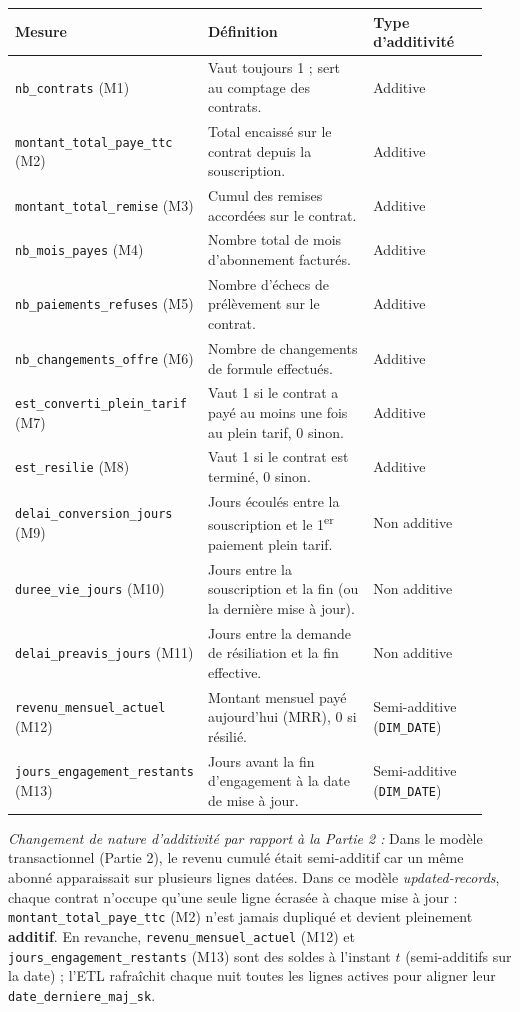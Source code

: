 \documentclass[a4paper,12pt]{article}
\begin{document}
\begin{center}
\renewcommand{\arraystretch}{1.25}
\begin{tabular}{@{}p{0.28\linewidth}p{0.40\linewidth}p{0.26\linewidth}@{}}
  \toprule
  \textbf{Mesure} & \textbf{Définition} & \textbf{Type d'additivité} \\
  \midrule
  \texttt{nb\_contrats} (M1) & Vaut toujours 1 ; sert au comptage des contrats. & Additive \\
  \texttt{montant\_total\_paye\_ttc} (M2) & Total encaissé sur le contrat depuis la souscription. & Additive \\
  \texttt{montant\_total\_remise} (M3) & Cumul des remises accordées sur le contrat. & Additive \\
  \texttt{nb\_mois\_payes} (M4) & Nombre total de mois d'abonnement facturés. & Additive \\
  \texttt{nb\_paiements\_refuses} (M5) & Nombre d'échecs de prélèvement sur le contrat. & Additive \\
  \texttt{nb\_changements\_offre} (M6) & Nombre de changements de formule effectués. & Additive \\
  \texttt{est\_converti\_plein\_tarif} (M7) & Vaut 1 si le contrat a payé au moins une fois au plein tarif, 0 sinon. & Additive \\
  \texttt{est\_resilie} (M8) & Vaut 1 si le contrat est terminé, 0 sinon. & Additive \\
  \texttt{delai\_conversion\_jours} (M9) & Jours écoulés entre la souscription et le 1\textsuperscript{er} paiement plein tarif. & Non additive \\
  \texttt{duree\_vie\_jours} (M10) & Jours entre la souscription et la fin (ou la dernière mise à jour). & Non additive \\
  \texttt{delai\_preavis\_jours} (M11) & Jours entre la demande de résiliation et la fin effective. & Non additive \\
  \texttt{revenu\_mensuel\_actuel} (M12) & Montant mensuel payé aujourd'hui (MRR), 0 si résilié. & Semi-additive (\texttt{DIM\_DATE}) \\
  \texttt{jours\_engagement\_restants} (M13) & Jours avant la fin d'engagement à la date de mise à jour. & Semi-additive (\texttt{DIM\_DATE}) \\
  \bottomrule
\end{tabular}
\end{center}

\noindent\textit{Changement de nature d'additivité par rapport à la Partie 2 :} Dans le modèle transactionnel (Partie 2), le revenu cumulé était semi-additif car un même abonné apparaissait sur plusieurs lignes datées. Dans ce modèle \emph{updated-records}, chaque contrat n'occupe qu'une seule ligne écrasée à chaque mise à jour : \texttt{montant\_total\_paye\_ttc} (M2) n'est jamais dupliqué et devient pleinement \textbf{additif}. En revanche, \texttt{revenu\_mensuel\_actuel} (M12) et \texttt{jours\_engagement\_restants} (M13) sont des soldes à l'instant $t$ (semi-additifs sur la date) ; l'ETL rafraîchit chaque nuit toutes les lignes actives pour aligner leur \texttt{date\_derniere\_maj\_sk}.
\end{document}
